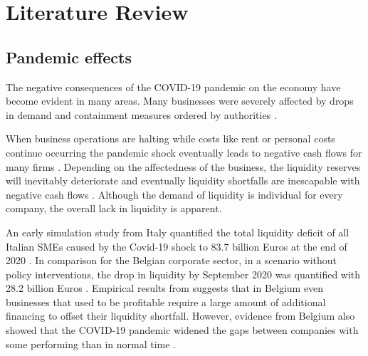 
\chapter{Literature Review} %

\label{Chapter2} %


\section{Pandemic effects}

The negative consequences of the COVID-19 pandemic on the economy have become evident in many areas. Many businesses were severely affected by drops in demand and containment measures ordered by authorities \parencite{eu_com_temporary_2020}.

When business operations are halting while costs like rent or personal costs continue occurring the pandemic shock eventually leads to negative cash flows for many firms \parencite{fernandez-cerezo_firm-level_2021}.
Depending on the affectedness of the business, the liquidity reserves will inevitably deteriorate and eventually liquidity shortfalls are inescapable with negative cash flows \parencite{puhr_have_2021}. Although the demand of liquidity is individual for every company, the overall lack in liquidity is apparent. 

An early simulation study from Italy quantified the total liquidity deficit of all Italian SMEs caused by the Covid-19 shock to 83.7 billion Euros at the end of 2020 \parencite{bellucci_consequences_2022}. In comparison for the Belgian corporate sector, in a scenario without policy interventions, the drop in liquidity by September 2020 was quantified with 28.2 billion Euros \parencite{tielens_belgian_2020}. Empirical results from \parencite{tielens_belgian_2020} suggests that in Belgium even businesses that used to be profitable require a large amount of additional financing to offset their liquidity shortfall. 
However, evidence from Belgium also showed that the COVID-19 pandemic widened the gaps between companies with some performing than in normal time \parencite{dhyne_belgian_2021}.  


